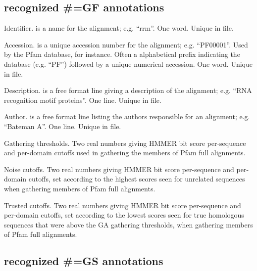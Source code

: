 \subsection{recognized \#=GF annotations}
\begin{sreitems}{}
\item [\monob{ID  <s>}] 
        Identifier.  is a name for the alignment;
        e.g. ``rrm''. One word. Unique in file.

\item [\monob{AC  <s>}]
        Accession.  is a unique accession number for the
        alignment; e.g. 
        ``PF00001''. Used by the Pfam database, for instance. 
        Often a alphabetical prefix indicating the database
        (e.g. ``PF'') followed by a unique numerical accession.
        One word. Unique in file. 
        
\item [\monob{DE  <s>}]
        Description.  is a free format line giving
        a description of the alignment; e.g.
        ``RNA recognition motif proteins''. One line. Unique in file.

\item [\monob{AU  <s>}]
        Author.  is a free format line listing the 
        authors responsible for an alignment; e.g. 
        ``Bateman A''. One line. Unique in file.

\item [\monob{GA  <f> <f>}]
        Gathering thresholds. Two real numbers giving HMMER bit score
        per-sequence and per-domain cutoffs used in gathering the
        members of Pfam full alignments. 
        
\item [\monob{NC  <f> <f>}]
        Noise cutoffs. Two real numbers giving HMMER bit score
        per-sequence and per-domain cutoffs, set according to the
        highest scores seen for unrelated sequences when gathering
        members of Pfam full alignments.

\item [\monob{TC  <f> <f>}]
        Trusted cutoffs. Two real numbers giving HMMER bit score
        per-sequence and per-domain cutoffs, set according to the
        lowest scores seen for true homologous sequences that
        were above the GA gathering thresholds, when gathering
        members of Pfam full alignments. 
\end{sreitems}

\subsection{recognized \#=GS annotations}

